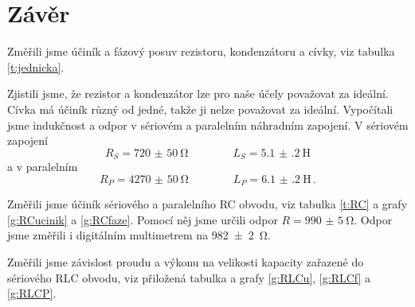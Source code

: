 \section*{Závěr}
Změřili jsme účiník a fázový posuv rezistoru, kondenzátoru a cívky, viz tabulka \ref{t:jednicka}.

Zjistili jsme, že rezistor a kondenzátor lze pro naše účely považovat za ideální.
Cívka má účiník různý od jedné, takže ji nelze považovat za ideální. Vypočítali jsme indukčnost a odpor v sériovém a paralelním náhradním zapojení. V sériovém zapojení
\begin{equation*}
R_S=\SI{720(50)}{\ohm}  \qquad \qquad L_S=\SI{5.1(2)}{\henry}
\end{equation*}
a v paralelním
\begin{equation*}
R_P=\SI{4270(50)}{\ohm} \qquad \qquad L_P=\SI{6.1(2)}{\henry} \,.
\end{equation*}

Změřili jsme účiník sériového a paralelního RC obvodu, viz tabulka \ref{t:RC} a grafy \ref{g:RCucinik} a \ref{g:RCfaze}. Pomocí něj jsme určili odpor $R = \SI{990(5)}{\ohm}$. Odpor jsme změřili i digitálním multimetrem na \SI{982(2)}{\ohm}.

Změřili jsme závislost proudu a výkonu na velikosti kapacity zařazené do sériového RLC obvodu, viz přiložená tabulka a grafy \ref{g:RLCu}, \ref{g:RLCf} a \ref{g:RLCP}.